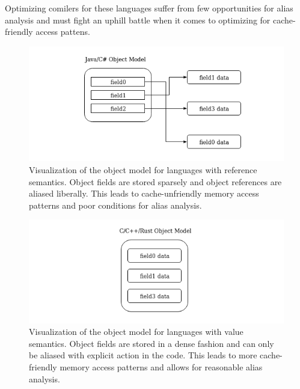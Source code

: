 \documentclass[nobib]{tufte-handout}
\begin{document}
 Optimizing comilers for these languages suffer from few opportunities for alias analysis and must fight an uphill battle when it comes to optimizing for cache-friendly access pattens.


\begin{figure}
\includegraphics[width=\linewidth]{images/JavaObjectModel.png}
\caption{Visualization of the object model for languages with reference semantics.  Object fields are stored sparsely and object references are aliased liberally.  This leads to cache-unfriendly memory access patterns and poor conditions for alias analysis.}
\label{fig:JavaObjectModel}
\end{figure}

\begin{figure}
\includegraphics[width=\linewidth]{images/CppObjectModel.png}
\caption{Visualization of the object model for languages with value semantics.  Object fields are stored in a dense fashion and can only be aliased with explicit action in the code.  This leads to more cache-friendly memory access patterns and allows for reasonable alias analysis.}
\label{fig:CppObjectModel}
\end{figure}
\end{document}
